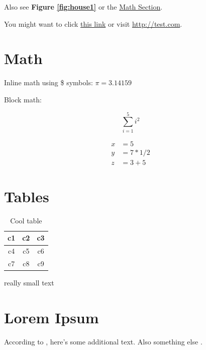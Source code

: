 \documentclass[10pt, letterpaper]{article}  %
\begin{document}
Also see \textbf{Figure \ref{fig:house1}} or the
\hyperref[sec:math]{Math Section}.

You might want to click \href{http://test.com}{this link} or visit \url{http://test.com}.



\section{Math}
\label{sec:math}

Inline math using \$ symbols: $\pi = 3.14159$

Block math:

\[
    \sum^{5}_{i=1} i^2
\]

\begin{align*}
    x &= 5 \\
    y &= 7 * 1 / 2 \\
    z &= 3 + 5
\end{align*}


\vspace{3in}
\section{Tables}

\begin{table}[h!]
\centering
\begin{tabular}{|c|c|c|}
    \hline
    c1 & c2 & c3 \\
    \hline
    c4 & c5 & c6 \\
    c7 & c8 & c9 \\
    \hline
\end{tabular}

\vspace{-0.3cm}
\caption{Cool table}
\end{table}

\begin{small}
    really small text
\end{small}









\section{Lorem Ipsum}
\lipsum[1-5]
According to \cite{Goodfellow_Goodfellow_Wilson_Hunt_2010}, here's some additional text. Also something else \citep{Szelogowski_2022}.





\pagebreak

\end{document}

